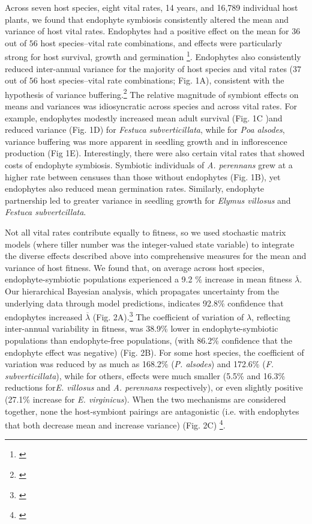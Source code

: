\documentclass[12pt]{article}
\newcommand{\tom}[2]{{\color{red}{#1}}\footnote{\textit{\color{red}{#2}}}}
\begin{document}
Across seven host species, eight vital rates, 14 years, and 16,789 individual host plants, we found that endophyte symbiosis consistently altered the mean and variance of host vital rates. 
Endophytes had a positive effect on the mean for $36$ out of $56$ host species--vital rate combinations, and effects were particularly strong for host survival, growth and germination \tom{(Fig. 1A)}{Nice figure- but I wonder if we could find more attractive line drawings for the grasses.}.
Endophytes also consistently reduced inter-annual variance for the majority of host species and vital rates ($37$ out of $56$ host species--vital rate combinations; Fig. 1A), consistent with the hypothesis of variance buffering.\tom{}{Need to say more, here and in the caption, about the quantities are shown in Fig 1. ``mean standardized effect size'' is ambiguous.} 
The relative magnitude of symbiont effects on means and variances was idiosyncratic across species and across vital rates.
For example, endophytes modestly increased mean adult survival (Fig. 1C )and reduced variance (Fig. 1D) for \emph{Festuca subverticillata}, while for \emph{Poa alsodes}, variance buffering was more apparent in seedling growth and in inflorescence production (Fig 1E). 
Interestingly, there were also certain vital rates that showed costs of endophyte symbiosis. 
Symbiotic individuals of \emph{A. perennans} grew at a higher rate between censuses than those without endophytes (Fig. 1B), yet endophytes also reduced mean germination rates. 
Similarly, endophyte partnership led to greater variance in seedling growth for \emph{Elymus villosus} and \emph{Festuca subvertcillata}.
 
Not all vital rates contribute equally to fitness, so we used stochastic matrix models (where tiller number was the integer-valued state variable) to integrate the diverse effects described above into comprehensive measures for the mean and variance of host fitness.
We found that, on average across host species, endophyte-symbiotic populations experienced a 9.2 \% increase in mean fitness $\overline{\lambda}$. 
Our hierarchical Bayesian analysis, which propagates uncertainty from the underlying data through model predictions, indicates 92.8\% confidence that endophytes increased $\overline{\lambda}$ (Fig. 2A).\tom{}{For Fig 2, can axis labels be changed to ``Symbiosis effect on''?}
The coefficient of variation of $\lambda$, reflecting inter-annual variability in fitness, was 38.9\% lower in endophyte-symbiotic populations than endophyte-free populations, (with 86.2\% confidence that the endophyte effect was negative) (Fig. 2B).
For some host species, the coefficient of variation was  reduced by as much as 168.2\% (\emph{P. alsodes}) and 172.6\% (\emph{F. subverticillata}), while for others, effects were much smaller (5.5\% and 16.3\% reductions for\emph{E. villosus} and \emph{A. perennans} respectively), or even slightly positive  (27.1\% increase for \emph{E. virginicus}).
When the two mechanisms are considered together, none the host-symbiont pairings are antagonistic (i.e. with endophytes that both decrease mean and increase variance) (Fig. 2C) \tom{suggesting that differences between hosts' mean and variance effects may reflect strategies which maximize their fitness}{Do not follow.}. 
\end{document}
